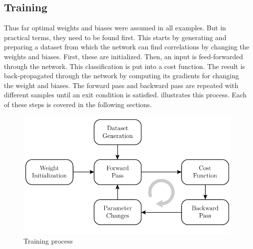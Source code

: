 \subsection{Training}
\label{sec:neural-networks-training}
Thus far optimal weights and biases were assumed in all examples.
But in practical terms, they need to be found first.
This starts by generating and preparing a dataset from which the network can find correlations by changing the weights and biases.
First, these are initialized.
Then, an input is feed-forwarded through the network.
This classification is put into a cost function.
The result is back-propagated through the network by computing its gradients for changing the weight and biases.
The forward pass and backward pass are repeated with different samples until an exit condition is satisfied.
 illustrates this process.
Each of these steps is covered in the following sections.
\begin{figure}
	\centering
	\includegraphics{images/training.pdf}
	\caption[Training process]{Training process}
	\label{fig:training}
\end{figure}





